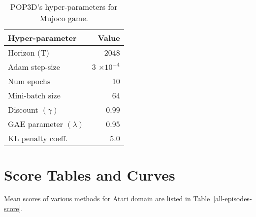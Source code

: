 \documentclass{article}
\begin{document}
\begin{table}
	\begin{center}
		\begin{tabular}{lr}
			\toprule
			Hyper-parameter & Value \\
			\midrule
			Horizon (T)    &2048 \\
			Adam step-size &3 $\times10^{-4}$\\
			Num epochs    & 10 \\
			Mini-batch size    & 64\\
			Discount $(\gamma)$     & 0.99\\
			GAE parameter $(\lambda)$      & 0.95 \\
			KL penalty coeff. &5.0 \\
			\bottomrule
		\end{tabular}
		\caption{POP3D's hyper-parameters for Mujoco game.}
		\label{POP3D-Mujoco-game-hyperparameter}
	\end{center}
\end{table}	

\section{Score Tables and Curves}
Mean scores of various methods for Atari domain are listed in Table~\ref{all-episodes-score}.
\end{document}
